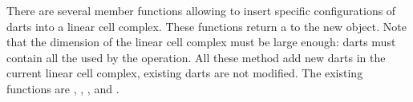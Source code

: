 There are several member functions allowing to insert specific
configurations of darts into a linear cell complex. These functions
return a  to the new object.  Note
that the dimension of the linear cell complex must be large enough:
darts must contain all the \betats{} used by the operation.  All these
method add new darts in the current linear cell complex, existing
darts are not modified. The existing functions
are , , %
, and . %


